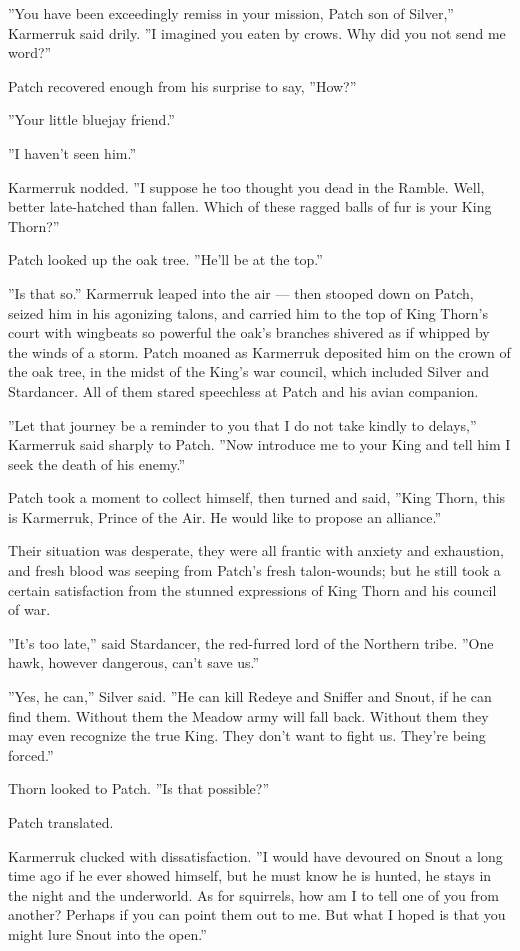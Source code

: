 \documentclass[12pt]{book}
\begin{document}
''You have been exceedingly remiss in your mission, Patch son of Silver,'' Karmerruk said drily. ''I imagined you eaten by crows. Why did you not send me word?''

Patch recovered enough from his surprise to say, ''How?''

''Your little bluejay friend.''

''I haven't seen him.''

Karmerruk nodded. ''I suppose he too thought you dead in the Ramble. Well, better late-hatched than fallen. Which of these ragged balls of fur is your King Thorn?''

Patch looked up the oak tree. ''He'll be at the top.''

''Is that so.'' Karmerruk leaped into the air ---
then stooped down on Patch, seized him in his agonizing talons, and carried him to the top of King Thorn's court with wingbeats so powerful the oak's branches shivered as if whipped by the winds of a storm. Patch moaned as Karmerruk deposited him on the crown of the oak tree, in the midst of the King's war council, which included Silver and Stardancer. All of them stared speechless at Patch and his avian companion.

''Let that journey be a reminder to you that I do not take kindly to delays,'' Karmerruk said sharply to Patch. ''Now introduce me to your King and tell him I seek the death of his enemy.''

Patch took a moment to collect himself, then turned and said, ''King Thorn, this is Karmerruk, Prince of the Air. He would like to propose an alliance.''

Their situation was desperate, they were all frantic with anxiety and exhaustion, and fresh blood was seeping from Patch's fresh talon-wounds; but he still took a certain satisfaction from the stunned expressions of King Thorn and his council of war.

''It's too late,'' said Stardancer, the red-furred lord of the Northern tribe. ''One hawk, however dangerous, can't save us.''

''Yes, he can,'' Silver said. ''He can kill Redeye and Sniffer and Snout, if he can find them. Without them the Meadow army will fall back. Without them they may even recognize the true King. They don't want to fight us. They're being forced.''

Thorn looked to Patch. ''Is that possible?''

Patch translated.

Karmerruk clucked with dissatisfaction. ''I would have devoured on Snout a long time ago if he ever showed himself, but he must know he is hunted, he stays in the night and the underworld. As for squirrels, how am I to tell one of you from another? Perhaps if you can point them out to me. But what I hoped is that you might lure Snout into the open.''
\end{document}
